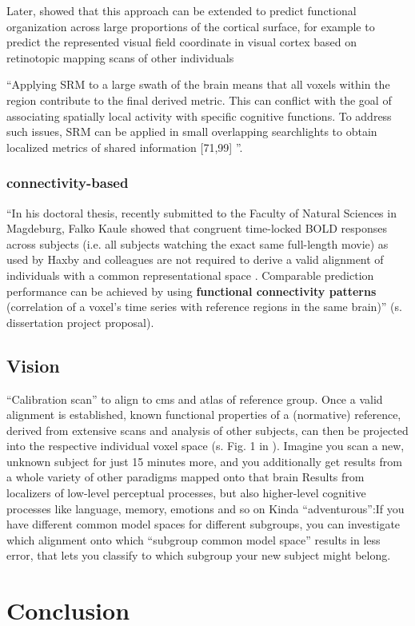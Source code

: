 Later, \citet{guntupalli2016model} showed that this approach can be extended to
predict functional organization across large proportions of the cortical
surface, for example to predict the represented visual field coordinate in
visual cortex based on retinotopic mapping scans of other individuals

``Applying SRM to a large swath of the brain means that all voxels within the
region contribute to the final derived metric. This can conflict with the goal
of associating spatially local activity with specific cognitive functions. To
address such issues, SRM can be applied in small overlapping searchlights to
obtain localized metrics of shared information [71,99]
\citep{cohen2017computational}''.


\subsubsection{connectivity-based}



``In his doctoral thesis, recently submitted to the Faculty of Natural Sciences
in Magdeburg, Falko Kaule showed that congruent time-locked BOLD responses
across subjects (i.e. all subjects watching the exact same full-length movie) as
used by Haxby and colleagues are not required to derive a valid alignment of
individuals with a common representational space \citep{kaule2017examination}.
%
Comparable prediction performance can be achieved by using \textbf{functional
connectivity patterns} (correlation of a voxel's time series with reference
regions in the same brain)'' (s. dissertation project proposal).


\citep{nastase2019leveraging}


\subsection{Vision}

``Calibration scan'' to align to \ac{cms} and atlas of reference group.
%
Once a valid alignment is established, known functional properties of a
(normative) reference, derived from extensive scans and analysis of other
subjects, can then be projected into the respective individual voxel space (s.
Fig. 1 in \citep{nishimoto2016lining}).
%
Imagine you scan a new, unknown subject for just 15 minutes more, and you
additionally get results from a whole variety of other paradigms mapped onto
that brain
%
Results from localizers of low-level perceptual processes, but also higher-level
cognitive processes like language, memory, emotions and so on
%
Kinda ``adventurous'':If you have different common model spaces for different
subgroups, you can investigate which alignment onto which ``subgroup common
model space'' results in less error, that lets you classify to which subgroup
your new subject might belong.


\section{Conclusion}
